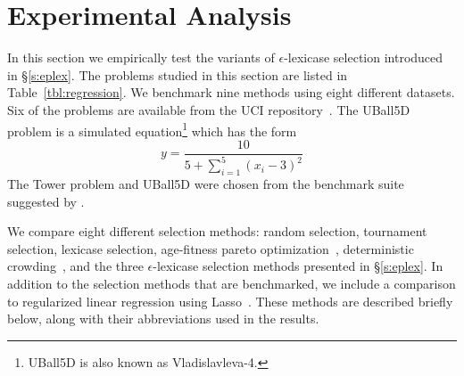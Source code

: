 \documentclass[twoside]{article}
\begin{document}
\section{Experimental Analysis} \label{s:exp}
In this section we empirically test the variants of $\epsilon$-lexicase selection introduced in \S\ref{s:eplex}. The problems studied in this section are listed in Table~\ref{tbl:regression}. We benchmark nine methods using eight different datasets. Six of the problems are available from the UCI repository~\citep{lichman_uci_2013}. The UBall5D problem is a simulated equation\footnote{UBall5D is also known as Vladislavleva-4.} which has the form \[ y = \frac{10}{5+\sum_{i=1}^5{(x_i-3)^2}}\] The Tower problem and UBall5D were chosen from the benchmark suite suggested by \cite{white_better_2012}. 

We compare eight different selection methods: random selection, tournament selection, lexicase selection, age-fitness pareto optimization~\citep{schmidt_age-fitness_2011}, deterministic crowding~\citep{mahfoud_niching_1995}, and the three $\epsilon$-lexicase selection methods presented in \S\ref{s:eplex}. In addition to the selection methods that are benchmarked, we include a comparison to regularized linear regression using Lasso~\citep{tibshirani_regression_1996}. These methods are described briefly below, along with their abbreviations used in the results.
\end{document}

